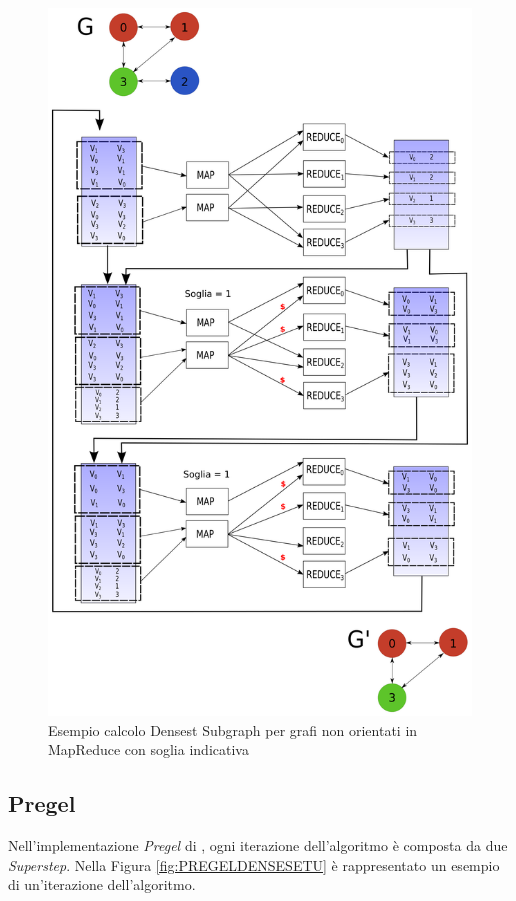 \documentclass[LaM,binding=0.6cm]{sapthesis}
\begin{document}
\begin{figure}
\centering
 \includegraphics[width=1\textwidth]{MR-denesestU}
\caption{Esempio calcolo Densest Subgraph per grafi non orientati in MapReduce con soglia indicativa}
\label{fig:MRDENSESETU}
\end{figure}




\subsection{Pregel}

Nell'implementazione \textit{Pregel} di \cite{Bahmani:2012:DSS:2140436.2140442}, ogni iterazione dell'algoritmo è composta da due \textit{Superstep}.
Nella Figura \ref{fig:PREGELDENSESETU} è rappresentato un esempio di un'iterazione dell'algoritmo.
\end{document}
